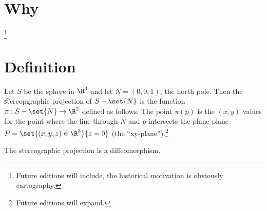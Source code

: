 

\section*{Why}
\footnote{Future editions will include, the historical motivation is obviously cartography.}
\section*{Definition}

Let $S$ be the sphere in $\R ^3$ and let $N = (0, 0, 1)$, the north pole.
Then the \t{stereopgraphic projection} of $S - \set{N}$ is the function $\pi : S - \set{N} \to \R ^2$ defined as follows.
The point $\pi (p)$ is the $(x, y)$ values for the point where the line through $N$ and $p$ intersects the plane plane $P = \set{(x, y, z) \in \R ^3}{z = 0}$ (the ``xy-plane'').\footnote{Future editions will expand.}

\begin{proposition}
The stereographic projection is a diffeomorphism.
\end{proposition}

\blankpage